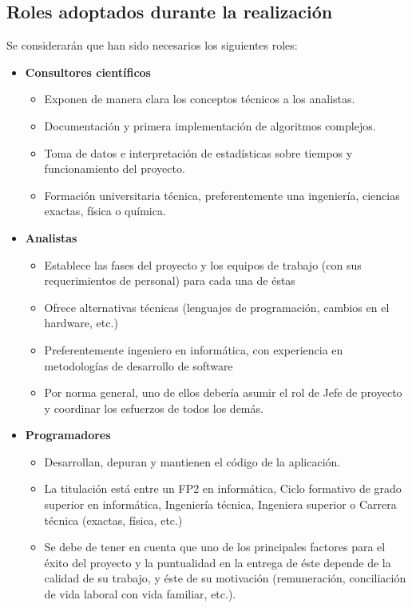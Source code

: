 \subsection{Roles adoptados durante la realización}
Se considerarán que han sido necesarios los siguientes roles:
\begin{itemize}
	\item{\textbf{Consultores científicos}
		\begin{itemize}
			\item{Exponen de manera clara los conceptos técnicos a los analistas.}
			\item{Documentación y primera implementación de algoritmos complejos.}
			\item{Toma de datos e interpretación de estadísticas sobre tiempos y funcionamiento del proyecto.}
			\item{Formación universitaria técnica, preferentemente una ingeniería, ciencias exactas, física o química.}
		\end{itemize}}

	\item{\textbf{Analistas}
		\begin{itemize}
			\item{Establece las fases del proyecto y los equipos de trabajo (con sus requerimientos de personal) para cada una de éstas}
			\item{Ofrece alternativas técnicas (lenguajes de programación, cambios en el hardware, etc.)}
			\item{Preferentemente ingeniero en informática, con experiencia en metodologías de desarrollo de software}
			\item{Por norma general, uno de ellos debería asumir el rol de Jefe de proyecto y coordinar los esfuerzos de todos los demás.}
		\end{itemize}}

	\item{\textbf{Programadores}
		\begin{itemize}
			\item{Desarrollan, depuran y mantienen el código de la aplicación.}
			\item{La titulación está entre un FP2 en informática, Ciclo formativo de grado superior en informática, Ingeniería técnica, Ingeniera superior o Carrera técnica (exactas, física, etc.)}
			\item{Se debe de tener en cuenta que uno de los principales factores para el éxito del proyecto y la puntualidad en la entrega de éste depende de la calidad de su trabajo, y éste de su motivación (remuneración, conciliación de vida laboral con vida familiar, etc.).}
		\end{itemize}}


\end{itemize}
